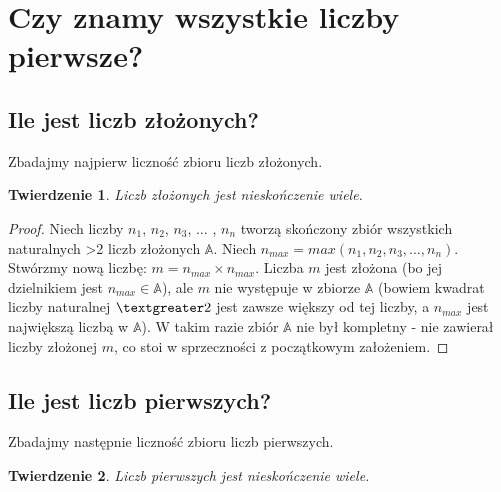 \documentclass[10pt,onecolumn]{article}
\newtheorem{theorem}{Twierdzenie}
\theoremstyle{definition}
\theoremstyle{hypothesis}
\theoremstyle{capability}
\begin{document}
\newpage


\newpage

\section{Czy znamy wszystkie liczby pierwsze?}

\subsection{Ile jest liczb złożonych?}

Zbadajmy najpierw liczność zbioru liczb złożonych.

\begin{theorem}
Liczb złożonych jest nieskończenie wiele.
\end{theorem}
 
\begin{proof}
 Niech liczby $n_1$, $n_2$, $n_3$, $\ldots$ , $n_n$ tworzą skończony zbiór wszystkich naturalnych \textgreater 2 liczb złożonych $\mathbb{A}$. Niech $n_{max} = max (n_1, n_2, n_3, \ldots, n_n)$. Stwórzmy nową liczbę: $m = n_{max} \times n_{max}$. Liczba $m$ jest złożona (bo jej dzielnikiem jest $n_{max} \in \mathbb{A}$), ale $m$ nie występuje w zbiorze $\mathbb{A}$ (bowiem kwadrat liczby naturalnej $\textgreater 2$ jest zawsze większy od tej liczby, a $n_{max}$ jest największą liczbą w $\mathbb{A}$). W takim razie zbiór $\mathbb{A}$ nie był kompletny - nie zawierał liczby złożonej $m$, co stoi w sprzeczności z początkowym założeniem.
\end{proof}

\subsection{Ile jest liczb pierwszych?}

Zbadajmy następnie liczność zbioru liczb pierwszych.

\begin{theorem}
Liczb pierwszych jest nieskończenie wiele.
\end{theorem}
 
\end{document}
